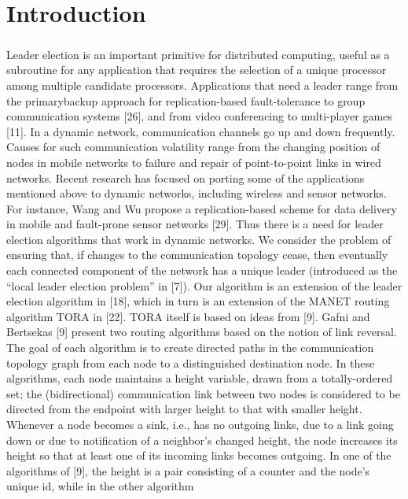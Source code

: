 \chapter{Introduction}

\paragraph{}Leader election is an important primitive for distributed computing, useful as a subroutine for any application that requires the selection of a unique processor among
multiple candidate processors. Applications that need a leader range from the primarybackup approach for replication-based fault-tolerance to group communication systems [26], and from video conferencing to multi-player games [11].
In a dynamic network, communication channels go up and down frequently. Causes
for such communication volatility range from the changing position of nodes in mobile networks to failure and repair of point-to-point links in wired networks. Recent
research has focused on porting some of the applications mentioned above to dynamic networks, including wireless and sensor networks. For instance, Wang and Wu
propose a replication-based scheme for data delivery in mobile and fault-prone sensor networks [29]. Thus there is a need for leader election algorithms that work in
dynamic networks.
We consider the problem of ensuring that, if changes to the communication topology cease, then eventually each connected component of the network has a unique
leader (introduced as the “local leader election problem” in [7]). Our algorithm is an
extension of the leader election algorithm in [18], which in turn is an extension of the
MANET routing algorithm TORA in [22]. TORA itself is based on ideas from [9].
Gafni and Bertsekas [9] present two routing algorithms based on the notion of link
reversal. The goal of each algorithm is to create directed paths in the communication
topology graph from each node to a distinguished destination node. In these algorithms, each node maintains a height variable, drawn from a totally-ordered set; the
(bidirectional) communication link between two nodes is considered to be directed
from the endpoint with larger height to that with smaller height. Whenever a node
becomes a sink, i.e., has no outgoing links, due to a link going down or due to notification of a neighbor’s changed height, the node increases its height so that at least one
of its incoming links becomes outgoing. In one of the algorithms of [9], the height is
a pair consisting of a counter and the node’s unique id, while in the other algorithm
